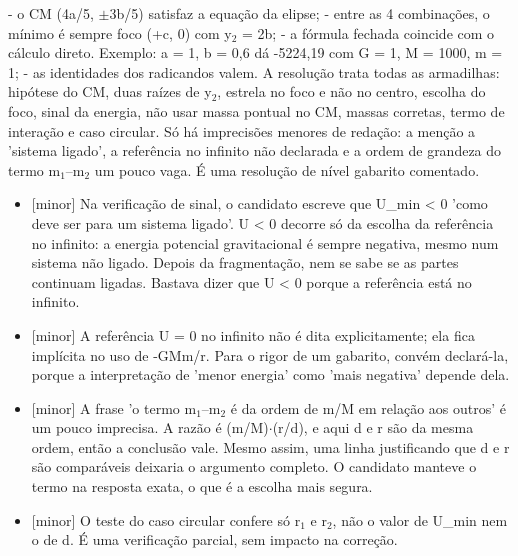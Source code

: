 \documentclass{article}%
\begin{document}
{-} o CM (4a/5, $\pm$3b/5) satisfaz a equação da elipse;\newline%
{-} entre as 4 combinações, o mínimo é sempre foco (+c, 0) com y$_{2}$ = 2b;\newline%
{-} a fórmula fechada coincide com o cálculo direto. Exemplo: a = 1, b = 0,6 dá -5224,19 com G = 1, M = 1000, m = 1;\newline%
{-} as identidades dos radicandos valem.\newline%
\newline%
A resolução trata todas as armadilhas: hipótese do CM, duas raízes de y$_{2}$, estrela no foco e não no centro, escolha do foco, sinal da energia, não usar massa pontual no CM, massas corretas, termo de interação e caso circular. Só há imprecisões menores de redação: a menção a 'sistema ligado', a referência no infinito não declarada e a ordem de grandeza do termo m$_{1}$--m$_{2}$ um pouco vaga. É uma resolução de nível gabarito comentado.%
\begin{itemize}%
\item%
{[}minor{]} Na verificação de sinal, o candidato escreve que U\_min < 0 'como deve ser para um sistema ligado'. U < 0 decorre só da escolha da referência no infinito: a energia potencial gravitacional é sempre negativa, mesmo num sistema não ligado. Depois da fragmentação, nem se sabe se as partes continuam ligadas. Bastava dizer que U < 0 porque a referência está no infinito.%
\item%
{[}minor{]} A referência U = 0 no infinito não é dita explicitamente; ela fica implícita no uso de -GMm/r. Para o rigor de um gabarito, convém declará{-}la, porque a interpretação de 'menor energia' como 'mais negativa' depende dela.%
\item%
{[}minor{]} A frase 'o termo m$_{1}$--m$_{2}$ é da ordem de m/M em relação aos outros' é um pouco imprecisa. A razão é (m/M)$\cdot$(r/d), e aqui d e r são da mesma ordem, então a conclusão vale. Mesmo assim, uma linha justificando que d e r são comparáveis deixaria o argumento completo. O candidato manteve o termo na resposta exata, o que é a escolha mais segura.%
\item%
{[}minor{]} O teste do caso circular confere só r$_{1}$ e r$_{2}$, não o valor de U\_min nem o de d. É uma verificação parcial, sem impacto na correção.%
\end{itemize}%
\end{document}
